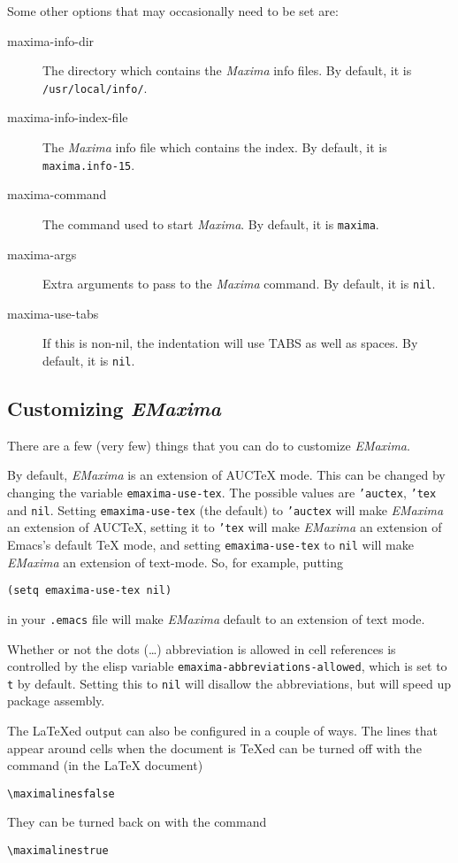 \documentclass{article}
\newcommand{\emx}{\textsl{\sffamily EMaxima}}
\newcommand{\mx}{\textsl{\sffamily Maxima}}
\begin{document}
Some other options that may occasionally need to be set are:
\begin{description}
\item[maxima-info-dir] The directory which contains the \mx{} info
  files.  By default, it is \texttt{/usr/local/info/}.
\item[maxima-info-index-file] The \mx{} info file which contains the
  index.  By default, it is \texttt{maxima.info-15}.
\item[maxima-command]  The command used to start \mx{}.  By default,
  it is \texttt{maxima}.
\item[maxima-args] Extra arguments to pass to the \mx{} command.  By
  default, it is \texttt{nil}.
\item[maxima-use-tabs]  If this is non-nil, the indentation will use
  TABS as well as spaces.  By default, it is \texttt{nil}.
\end{description}


\subsection{Customizing \emx{}}
\label{app:custemx}

There are a few (very few) things that you can do to customize \emx{}.  

By default, \emx{} is an extension of AUC\TeX{} mode.  This can be
changed by changing the variable \texttt{emaxima-use-tex}.  The possible
values are \texttt{'auctex}, \texttt{'tex} and \texttt{nil}.  Setting
\texttt{emaxima-use-tex} (the default) to \texttt{'auctex} will make \emx{}
an extension of AUC\TeX{}, setting it to \texttt{'tex} will make \emx{} an
extension of Emacs's default \TeX{} mode, and setting
\texttt{emaxima-use-tex} to \texttt{nil} will make \emx{} an extension of
text-mode.  So, for example, putting 
\begin{verbatim}
(setq emaxima-use-tex nil)
\end{verbatim}
\noindent
in your \texttt{.emacs} file will make \emx{} default to an extension of
text mode. 

Whether or not the dots (\dots{}) abbreviation is allowed in cell
references is controlled by the elisp variable
\texttt{emaxima-abbreviations-allowed}, which is set to \texttt{t} by
default.  Setting this to \texttt{nil} will disallow the abbreviations,
but will speed up package assembly.

The \LaTeX{}ed output can also be configured in a couple of ways.
The lines that appear around cells when the document is \TeX{}ed can be
turned off with the command (in the \LaTeX{} document)
\begin{verbatim}
\maximalinesfalse
\end{verbatim}
\noindent
They can be turned back on with the command
\begin{verbatim}
\maximalinestrue
\end{verbatim}
\noindent
\end{document}
